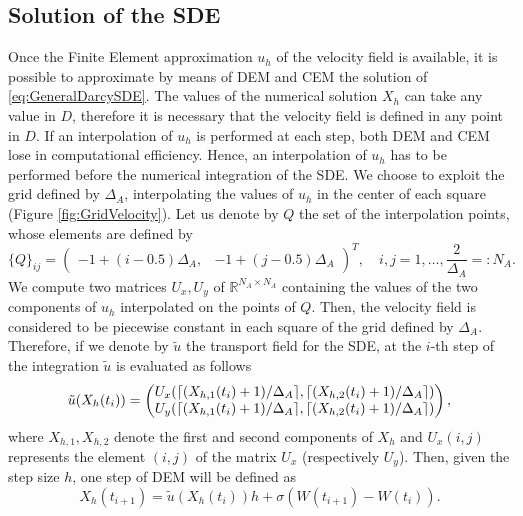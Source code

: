 \subsection{Solution of the SDE}

Once the Finite Element approximation $u_h$ of the velocity field is available, it is possible to approximate by means of DEM and CEM the solution of \eqref{eq:GeneralDarcySDE}. The values of the numerical solution $X_h$ can take any value in $D$, therefore it is necessary that the velocity field is defined in any point in $D$. If an interpolation of $u_h$ is performed at each step, both DEM and CEM lose in computational efficiency. Hence, an interpolation of $u_h$ has to be performed before the numerical integration of the SDE. We choose to exploit the grid defined by $\Delta_A$, interpolating the values of $u_h$ in the center of each square (Figure \ref{fig:GridVelocity}). Let us denote by $Q$ the set of the interpolation points, whose elements are defined by
\begin{equation}\label{eq:InterpMatrix}
	\{Q\}_{ij} = \begin{pmatrix} -1 + (i-0.5)\Delta_A, & -1 + (j-0.5)\Delta_A \end{pmatrix}^T, \quad i,j = 1, \dots, \frac{2}{\Delta_A} =: N_A.
\end{equation}
We compute two matrices $U_x, U_y$ of $\mathbb{R}^{N_A \times N_A}$ containing the values of the two components of $u_h$ interpolated on the points of $Q$. Then, the velocity field is considered to be piecewise constant in each square of the grid defined by $\Delta_A$. Therefore, if we denote by $\tilde{u}$ the transport field for the SDE, at the $i$-th step of the integration $\tilde{u}$ is evaluated as follows
\begin{equation}\label{eq:VelEval}
	\tilde{u}(X_h(t_i)) = \begin{pmatrix}	U_x(\lceil(X_{h,1}(t_i)+1)/\Delta_A\rceil,\lceil(X_{h,2}(t_i)+1)/\Delta_A\rceil) \\
					U_y(\lceil(X_{h,1}(t_i)+1)/\Delta_A\rceil,\lceil(X_{h,2}(t_i)+1)/\Delta_A\rceil) \end{pmatrix},
\end{equation}
where $X_{h,1}, X_{h,2}$ denote the first and second components of $X_h$ and $U_x(i,j)$ represents the element $(i,j)$ of the matrix $U_x$ (respectively $U_y$). Then, given the step size $h$, one step of DEM will be defined as
\begin{equation}\label{eq:DEMDarcy}
	X_h(t_{i+1}) = \tilde{u}(X_h(t_i)) h + \sigma (W(t_{i+1}) - W(t_i)).
\end{equation}

